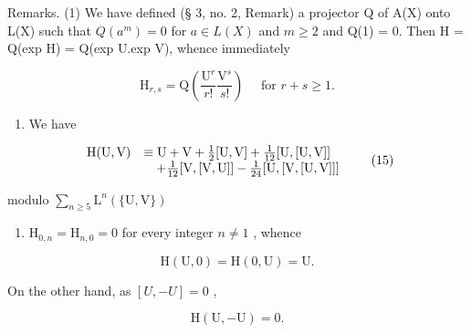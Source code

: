 Remarks. (1) We have defined (§ 3, no. 2, Remark) a projector Q of A(X) onto L(X) such that \(Q(a^{m}) = 0\) for \(a \in L(X)\) and \(m \geqslant 2\) and Q(1) = 0. Then H = Q(exp H) = Q(exp U.exp V), whence immediately

\[
\mathrm{H} _ {r, s} = \mathrm{Q} \left(\frac {\mathrm{U} ^ {r}}{r !} \frac {\mathrm{V} ^ {s}}{s !}\right) \quad \text { for } r + s \geqslant 1.\tag{14}
\]

\begin{enumerate}
\def\labelenumi{(\arabic{enumi})}
\setcounter{enumi}{1}
\tightlist
\item
  We have
\end{enumerate}

\[
\begin{array}{r l} \mathrm{H(U,V)} & \equiv \mathrm{U+V} + \frac {1}{2} [ \mathrm{U,V} ] + \frac {1}{12} [ \mathrm{U,[U,V]} ] \\ & \quad + \frac {1}{12} [ \mathrm{V,[V,U]} ] - \frac {1}{24} [ \mathrm{U,[V,[U,V]} ] ] \end{array} \tag {15}
\]

modulo \(\sum_{n\geqslant 5}\mathrm{L}^n (\{\mathrm{U},\mathrm{V}\})\)

\begin{enumerate}
\def\labelenumi{(\arabic{enumi})}
\setcounter{enumi}{2}
\tightlist
\item
  \(\mathrm{H}_{0,n} = \mathrm{H}_{n,0} = 0\) for every integer \(n\neq 1\) , whence
\end{enumerate}

\[
\mathrm{H} (\mathrm{U}, 0) = \mathrm{H} (0, \mathrm{U}) = \mathrm{U}.\tag{16}
\]

On the other hand, as \([U, -U] = 0\) ,

\[
\mathrm{H} (\mathrm{U}, - \mathrm{U}) = 0.\tag{17}
\]


